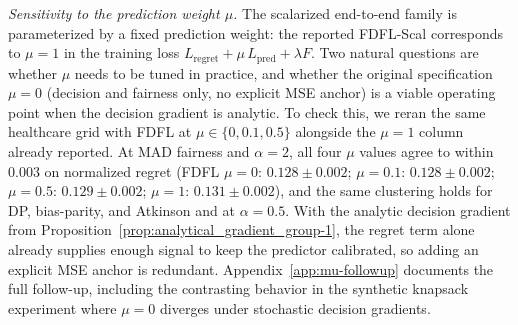 
\textit{Sensitivity to the prediction weight $\mu$.}
The scalarized end-to-end family is parameterized by a fixed prediction
weight: the reported FDFL-Scal corresponds to $\mu=1$ in the training
loss $L_{\mathrm{regret}} + \mu\,L_{\mathrm{pred}} + \lambda F$. Two
natural questions are whether $\mu$ needs to be tuned in practice, and
whether the original specification $\mu = 0$ (decision and fairness
only, no explicit MSE anchor) is a viable operating point when the
decision gradient is analytic. To check this, we reran the same
healthcare grid with FDFL at $\mu \in \{0, 0.1, 0.5\}$ alongside the
$\mu = 1$ column already reported. At MAD fairness and $\alpha = 2$,
all four $\mu$ values agree to within $0.003$ on normalized regret
(FDFL $\mu=0$: $0.128 \pm 0.002$; $\mu=0.1$: $0.128 \pm 0.002$;
$\mu=0.5$: $0.129 \pm 0.002$; $\mu=1$: $0.131 \pm 0.002$), and the
same clustering holds for DP, bias-parity, and Atkinson and at
$\alpha = 0.5$. With the analytic decision gradient from
Proposition~\ref{prop:analytical_gradient_group-1}, the regret term
alone already supplies enough signal to keep the predictor calibrated,
so adding an explicit MSE anchor is redundant. Appendix~\ref{app:mu-followup}
documents the full follow-up, including the contrasting behavior in
the synthetic knapsack experiment where $\mu = 0$ diverges under
stochastic decision gradients.
